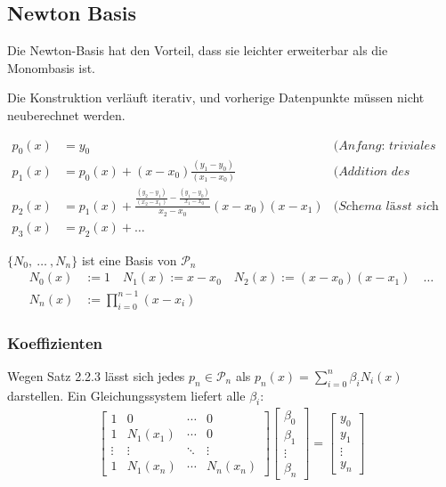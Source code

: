 \subsection{Newton Basis}

Die Newton-Basis hat den Vorteil, dass sie leichter erweiterbar als die Monombasis ist.

Die Konstruktion verläuft iterativ, und vorherige Datenpunkte müssen nicht neuberechnet werden.

\begin{align*}
    p_0(x) &= y_0 &\textit{(Anfang: triviales Polynom)} \\
    p_1(x) &= p_0(x) + (x-x_0)\frac{(y_1-y_0)}{(x_1-x_0)} & \textit{(Addition des zweiten Datenpunktes)} \\
    p_2(x) &= p_1(x) + \frac{\frac{(y_2-y_1)}{(x_2-x_1)}-\frac{(y_1-y_0)}{x_1-x_0}}{x_2-x_0} (x-x_0)(x-x_1) & \textit{(Schema lässt sich beliebig weiterführen)}\\
    p_3(x) &= p_2(x) + \ldots
\end{align*}

 $\{ N_0,\ \ldots\ ,N_n\}$ ist eine Basis von $\mathcal{P}_n$
\begin{align*}
    N_0(x) &:= 1 \quad
    N_1(x) := x - x_0 \quad
    N_2(x) := (x-x_0)(x-x_1) \quad \ldots \\
    N_n(x) &:= \prod_{i=0}^{n-1} (x-x_i)
\end{align*}

\subsubsection{Koeffizienten}

Wegen Satz 2.2.3 lässt sich jedes $p_n \in \mathcal{P}_n$ als $p_n(x) =\displaystyle\sum_{i=0}^{n} \beta_i N_i(x)$ darstellen. Ein Gleichungssystem liefert alle $\beta_i$:
\begin{align*}
    \begin{bmatrix}
        1 & 0   & \cdots & 0 \\
        1 & N_1(x_1) & \cdots & 0 \\
        \vdots & \vdots & \ddots & \vdots \\
        1 & N_1(x_n) & \cdots & N_n(x_n)
    \end{bmatrix}
    \begin{bmatrix}
        \beta_0 \\
        \beta_1 \\
        \vdots \\
        \beta_n
    \end{bmatrix}
    =
    \begin{bmatrix}
        y_0 \\
        y_1 \\
        \vdots \\
        y_n
    \end{bmatrix}
\end{align*}

